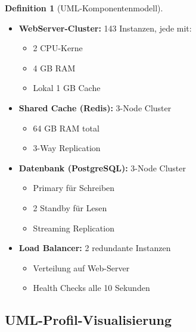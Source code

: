\documentclass[a4paper,11pt]{article}
\theoremstyle{definition}
\newtheorem{definition}{Definition}
\begin{document}
\begin{definition}[UML-Komponentenmodell]
    \label{def:order_service_components}
    
    \begin{itemize}
        \item \textbf{WebServer-Cluster:} 143 Instanzen, jede mit:
            \begin{itemize}
                \item 2 CPU-Kerne
                \item 4 GB RAM
                \item Lokal 1 GB Cache
            \end{itemize}
        
        \item \textbf{Shared Cache (Redis):} 3-Node Cluster
            \begin{itemize}
                \item 64 GB RAM total
                \item 3-Way Replication
            \end{itemize}
        
        \item \textbf{Datenbank (PostgreSQL):} 3-Node Cluster
            \begin{itemize}
                \item Primary für Schreiben
                \item 2 Standby für Lesen
                \item Streaming Replication
            \end{itemize}
        
        \item \textbf{Load Balancer:} 2 redundante Instanzen
            \begin{itemize}
                \item Verteilung auf Web-Server
                \item Health Checks alle 10 Sekunden
            \end{itemize}
    \end{itemize}
\end{definition}

\subsection{UML-Profil-Visualisierung}
\end{document}
